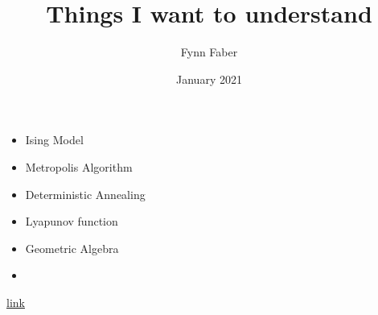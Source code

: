 \documentclass{article}
\title{Things I want to understand}
\author{Fynn Faber}
\date{January 2021}
\begin{document}
\maketitle

\begin{itemize}
    \item Ising Model
    \item Metropolis Algorithm
    \item Deterministic Annealing
    \item Lyapunov function
    \item Geometric Algebra
    \item 
\end{itemize}

\href{run:./bla.flac}{link}
\end{document}
